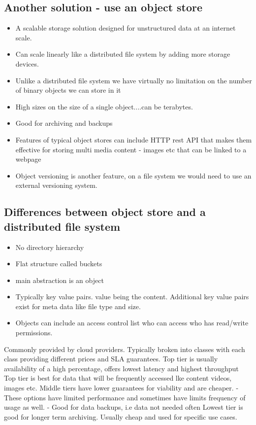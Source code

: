\subsection{Another solution - use an object store}
\begin{itemize}
    \item A scalable storage solution designed for unstructured data at an internet scale.
    \item Can scale linearly like a distributed file system by adding more storage devices.
    \item Unlike a distributed file system we have virtually no limitation on the number of binary objects we can store in it
    \item High sizes on the size of a single object....can be terabytes.
    \item Good for archiving and backups
    \item Features of typical object stores can include HTTP rest API that makes them effective for storing multi media content - images etc that can be linked to a webpage
    \item Object versioning is another feature, on a file system we would need to use an external versioning system.
\end{itemize}

\subsection{Differences between object store and a distributed file system}
\begin{itemize}
    \item No directory hierarchy
    \item Flat structure called buckets
    \item main abstraction is an object
    \item Typically key value pairs. value being the content. Additional key value pairs exist for meta data like file type and size.
    \item Objects can include an access control list who can access who has read/write permissions.
\end{itemize}

Commonly provided by cloud providers.
Typically broken into classes with each class providing different prices and SLA guarantees.
Top tier is usually availability of a high percentage, offers lowest latency and highest throughput
Top tier is best for data that will be frequently accessed lke content videos, images etc.
Middle tiers have lower guarantees for viability and are cheaper.
- These options have limited performance and sometimes have limits frequency of usage as well.
- Good for data backups, i.e data not needed often
Lowest tier is good for longer term archiving.
Usually cheap and used for specific use cases.

